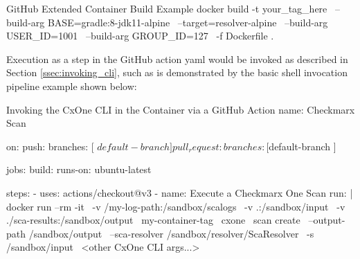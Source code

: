 \begin{code}{GitHub Extended Container Build Example}{}{}
docker build -t your_tag_here \
    --build-arg BASE=gradle:8-jdk11-alpine \
    --target=resolver-alpine \
    --build-arg USER_ID=1001 \
    --build-arg GROUP_ID=127 \
    -f Dockerfile .    
\end{code}


Execution as a step in the GitHub action yaml would be invoked as described in 
Section \ref{ssec:invoking_cli}, such as is demonstrated by the basic shell invocation pipeline
example shown below:\\

\begin{code}{Invoking the CxOne CLI in the Container via a GitHub Action}{}{}
name: Checkmarx Scan

on:
    push:
        branches: [ $default-branch ]
    pull_request:
        branches: [ $default-branch ]

jobs:
    build:
        runs-on: ubuntu-latest

    steps:
        - uses: actions/checkout@v3
        - name: Execute a Checkmarx One Scan
            run: |
                docker run --rm -it \
                -v /my-log-path:/sandbox/scalogs \
                -v .:/sandbox/input \
                -v ./sca-results:/sandbox/output \
                my-container-tag \
                cxone \
                scan create \
                --output-path /sandbox/output \
                --sca-resolver /sandbox/resolver/ScaResolver \
                -s /sandbox/input \
                <other CxOne CLI args...>            
    
\end{code}
